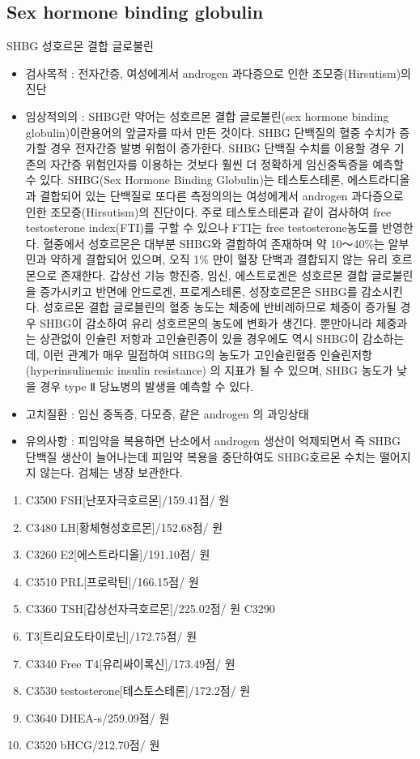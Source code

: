 \subsection{Sex hormone binding globulin}
SHBG 성호르몬 결합 글로불린 
\begin{itemize}[◉]\tightlist
\item 검사목적 : 전자간증, 여성에게서 androgen 과다증으로 인한 조모증(Hirsutism)의 진단 
\item 임상적의의 : SHBG란 약어는 성호르몬 결합 글로불린(sex hormone binding globulin)이란용어의 앞글자를 따서 만든 것이다. SHBG 단백질의 혈중 수치가 증가할 경우 전자간증 발병 위험이 증가한다. SHBG 단백질 수치를 이용할 경우 기존의 자간증 위험인자를 이용하는 것보다 훨씬 더 정확하게 임신중독증을 예측할 수 있다. SHBG(Sex Hormone Binding Globulin)는 테스토스테론, 에스트라디올과 결합되어 있는 단백질로 또다른 측정의의는 여성에게서 androgen 과다증으로 인한 조모증(Hirsutism)의 진단이다. 주로 테스토스테론과 같이 검사하여 free testosterone index(FTI)를 구할 수 있으나 FTI는 free testosterone농도를 반영한다. 혈중에서 성호르몬은 대부분 SHBG와 결합하여 존재하며 약 10〜40\%는 알부민과 약하게 결합되어 있으며, 오직 1\% 만이 혈장 단백과 결합되지 않는 유리 호르몬으로 존재한다. 갑상선 기능 항진증, 임신, 에스트로겐은 성호르몬 결합 글로불린을 증가시키고 반면에 안드로겐, 프로게스테론, 성장호르몬은 SHBG를 감소시킨다. 성호르몬 결합 글로블린의 혈중 농도는 체중에 반비례하므로 체중이 증가될 경우 SHBG이 감소하여 유리 성호르몬의 농도에 변화가 생긴다. 뿐만아니라 체중과는 상관없이 인슐린 저항과 고인슐린증이 있을 경우에도 역시 SHBG이 감소하는데, 이런 관계가 매우 밀접하여 SHBG의 농도가 고인슐린혈증 인슐린저항 (hyperinsulinemic insulin resistance) 의 지표가 될 수 있으며, SHBG 농도가 낮을 경우 type Ⅱ 당뇨병의 발생을 예측할 수 있다. 
\item 고치질환 : 임신 중독증, 다모증, 같은 androgen 의 과잉상태 
\item 유의사항 : 피임약을 복용하면 난소에서 androgen 생산이 억제되면서 즉 SHBG 단백질 생산이 늘어나는데 피임약 복용을 중단하여도 SHBG호르몬 수치는 떨어지지 않는다. 검체는 냉장 보관한다. 
\end{itemize}
\begin{enumerate}\tightlist
\item C3500 FSH[난포자극호르몬]/159.41점/ 원
\item C3480 LH[황체형성호르몬]/152.68점/ 원
\item C3260 E2[에스트라디올]/191.10점/ 원
\item C3510 PRL[프로락틴]/166.15점/ 원
\item C3360 TSH[갑상선자극호르몬]/225.02점/ 원 C3290 
\item T3[트리요도타이로닌]/172.75점/ 원
\item C3340 Free T4[유리싸이록신]/173.49점/ 원
\item C3530 testosterone[테스토스테론]/172.2점/ 원
\item C3640 DHEA-s/259.09점/ 원
\item C3520 bHCG/212.70점/ 원
\end{enumerate}


